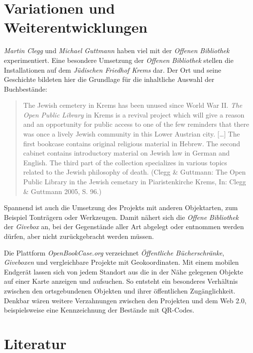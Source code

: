 \documentclass[a4paper,
fontsize=11pt,
oneside,
numbers=noperiodatend,
parskip=half-,
bibliography=totoc,
final
]{scrartcl}
\begin{document}
\section*{Variationen und
Weiterentwicklungen}\label{variationen-und-weiterentwicklungen}

\emph{Martin Clegg} und \emph{Michael Guttmann} haben viel mit der
\emph{Offenen Bibliothek} experimentiert. Eine besondere Umsetzung der
\emph{Offenen} \emph{Bibliothek} stellen die Installationen auf dem
\emph{Jüdischen Friedhof Krems} dar. Der Ort und seine Geschichte
bildeten hier die Grundlage für die inhaltliche Auswahl der
Buchbestände:

\begin{quote}
The Jewish cemetery in Krems has been unused since World War II.
\emph{The Open Public Library} in Krems is a revival project which will
give a reason and an opportunity for public access to one of the few
reminders that there was once a lively Jewish community in this Lower
Austrian city. {[}\ldots{}{]} The first bookcase contains original
religious material in Hebrew. The second cabinet contains introductory
material on Jewish law in German and English. The third part of the
collection specializes in various topics related to the Jewish
philosophy of death. (Clegg \& Guttmann: The Open Public Library in the
Jewish cemetary in Piaristenkirche Krems, In: Clegg \& Guttmann 2005, S.
96.)
\end{quote}

Spannend ist auch die Umsetzung des Projekts mit anderen Objektarten,
zum Beispiel Tonträgern oder Werkzeugen. Damit nähert sich die
\emph{Offene Bibliothek} der \emph{Givebox} an, bei der Gegenstände
aller Art abgelegt oder entnommen werden dürfen, aber nicht
zurückgebracht werden müssen.

Die Plattform \emph{OpenBookCase.org} verzeichnet \emph{Öffentliche
Bücherschränke}, \emph{Giveboxen} und vergleichbare Projekte mit
Geokoordinaten. Mit einem mobilen Endgerät lassen sich von jedem
Standort aus die in der Nähe gelegenen Objekte auf einer Karte anzeigen
und aufsuchen. So entsteht ein besonderes Verhältnis zwischen den
ortsgebundenen Objekten und ihrer öffentlichen Zugänglichkeit. Denkbar
wären weitere Verzahnungen zwischen den Projekten und dem Web 2.0,
beispielsweise eine Kennzeichnung der Bestände mit QR-Codes.

\newpage

\section*{Literatur}\label{literatur}
\end{document}
